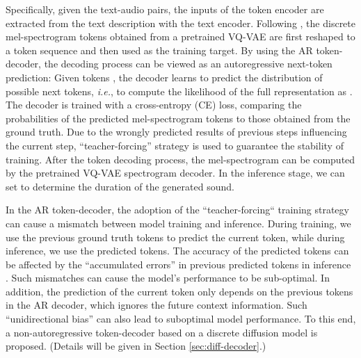 \documentclass[lettersize,journal]{IEEEtran}
\begin{document}
{\color{black}Specifically, given the text-audio pairs, the inputs of the token encoder are extracted from the text description with the text encoder.}
{\color{black} Following \cite{iashin2021taming}, the discrete mel-spectrogram tokens  obtained from a pretrained VQ-VAE are first reshaped to a token sequence  and then used as the training target.}
By using the AR token-decoder, the decoding process can be viewed as an autoregressive next-token prediction: Given tokens , the decoder learns to predict the distribution of possible next tokens, \textit{i.e.},  to compute the likelihood of the full representation as . 
The decoder is trained with a cross-entropy (CE) loss, comparing  {\color{black}the probabilities of the predicted} mel-spectrogram tokens to those obtained from the ground truth. 
Due to the wrongly predicted results of previous steps influencing the current step, ``teacher-forcing'' strategy \cite{esser2021imagebart} is used to guarantee the stability of training. 
{\color{black}{The ``teacher-forcing'' strategy uses ground truth tokens as previous step prediction results.}} 
{\color{black}After the token decoding process, the mel-spectrogram can be computed by the pretrained VQ-VAE spectrogram decoder.}
{\color{black}In the inference stage, we can set  to determine the duration of the generated sound.} 


{\color{black}In the AR token-decoder, the adoption of the ``teacher-forcing`` training strategy can cause a mismatch between model training and inference. During training, we use the previous ground truth tokens to predict the current token, while during inference, we use the predicted tokens. The accuracy of the predicted tokens can be affected by the ``accumulated errors'' in previous predicted tokens in inference \cite{schmidt2019generalization}. Such mismatches can cause the model's performance to be sub-optimal.}
{\color{black} In addition, the prediction of the current token only depends on the previous tokens in the AR decoder, which ignores the future context information. Such ``unidirectional bias'' can also lead to suboptimal model performance.}
To this end, a non-autoregressive token-decoder based on a discrete diffusion model is proposed. (Details will be given in Section \ref{sec:diff-decoder}.)
\end{document}
